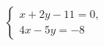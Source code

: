 \begin{ex}
	\begin{condition}
		\( \left\{
		\begin{array}{l}
			x+2y-11=0,\\
			4x-5y=-8
		\end{array}
		\right. \)
	\end{condition}
\end{ex}